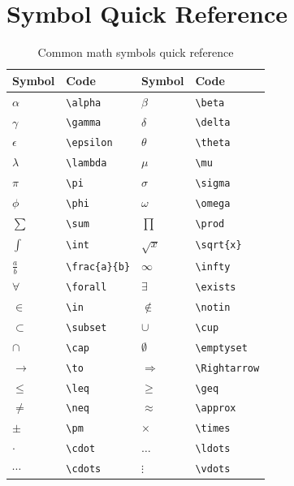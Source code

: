 \section{Symbol Quick Reference}

\begin{table}[H]
\centering
\begin{tabular}{llll}
\toprule
\textbf{Symbol} & \textbf{Code} & \textbf{Symbol} & \textbf{Code} \\
\midrule
$\alpha$   & \verb|\alpha|   & $\beta$    & \verb|\beta| \\
$\gamma$   & \verb|\gamma|   & $\delta$   & \verb|\delta| \\
$\epsilon$ & \verb|\epsilon| & $\theta$   & \verb|\theta| \\
$\lambda$  & \verb|\lambda|  & $\mu$      & \verb|\mu| \\
$\pi$      & \verb|\pi|      & $\sigma$   & \verb|\sigma| \\
$\phi$     & \verb|\phi|     & $\omega$   & \verb|\omega| \\
$\sum$     & \verb|\sum|     & $\prod$    & \verb|\prod| \\
$\int$     & \verb|\int|     & $\sqrt{x}$ & \verb|\sqrt{x}| \\
$\frac{a}{b}$ & \verb|\frac{a}{b}| & $\infty$ & \verb|\infty| \\
$\forall$  & \verb|\forall|  & $\exists$  & \verb|\exists| \\
$\in$      & \verb|\in|      & $\notin$   & \verb|\notin| \\
$\subset$  & \verb|\subset|  & $\cup$     & \verb|\cup| \\
$\cap$     & \verb|\cap|     & $\emptyset$& \verb|\emptyset| \\
$\to$      & \verb|\to|      & $\Rightarrow$ & \verb|\Rightarrow| \\
$\leq$     & \verb|\leq|     & $\geq$     & \verb|\geq| \\
$\neq$     & \verb|\neq|     & $\approx$  & \verb|\approx| \\
$\pm$      & \verb|\pm|      & $\times$   & \verb|\times| \\
$\cdot$    & \verb|\cdot|    & $\ldots$   & \verb|\ldots| \\
$\cdots$   & \verb|\cdots|   & $\vdots$   & \verb|\vdots| \\
\bottomrule
\end{tabular}
\caption{Common math symbols quick reference}
\end{table}

